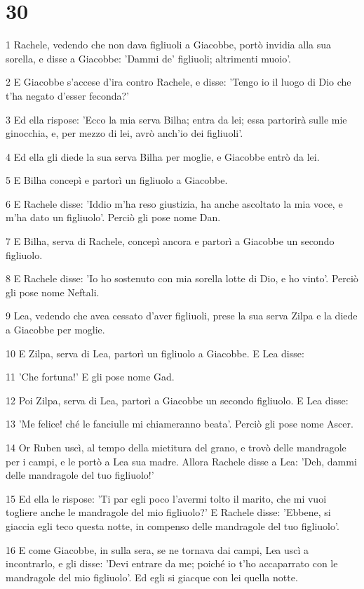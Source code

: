 \chapter{30}

\par 1 Rachele, vedendo che non dava figliuoli a Giacobbe, portò invidia alla sua sorella, e disse a Giacobbe: 'Dammi de' figliuoli; altrimenti muoio'.
\par 2 E Giacobbe s'accese d'ira contro Rachele, e disse: 'Tengo io il luogo di Dio che t'ha negato d'esser feconda?'
\par 3 Ed ella rispose: 'Ecco la mia serva Bilha; entra da lei; essa partorirà sulle mie ginocchia, e, per mezzo di lei, avrò anch'io dei figliuoli'.
\par 4 Ed ella gli diede la sua serva Bilha per moglie, e Giacobbe entrò da lei.
\par 5 E Bilha concepì e partorì un figliuolo a Giacobbe.
\par 6 E Rachele disse: 'Iddio m'ha reso giustizia, ha anche ascoltato la mia voce, e m'ha dato un figliuolo'. Perciò gli pose nome Dan.
\par 7 E Bilha, serva di Rachele, concepì ancora e partorì a Giacobbe un secondo figliuolo.
\par 8 E Rachele disse: 'Io ho sostenuto con mia sorella lotte di Dio, e ho vinto'. Perciò gli pose nome Neftali.
\par 9 Lea, vedendo che avea cessato d'aver figliuoli, prese la sua serva Zilpa e la diede a Giacobbe per moglie.
\par 10 E Zilpa, serva di Lea, partorì un figliuolo a Giacobbe. E Lea disse:
\par 11 'Che fortuna!' E gli pose nome Gad.
\par 12 Poi Zilpa, serva di Lea, partorì a Giacobbe un secondo figliuolo. E Lea disse:
\par 13 'Me felice! ché le fanciulle mi chiameranno beata'. Perciò gli pose nome Ascer.
\par 14 Or Ruben uscì, al tempo della mietitura del grano, e trovò delle mandragole per i campi, e le portò a Lea sua madre. Allora Rachele disse a Lea: 'Deh, dammi delle mandragole del tuo figliuolo!'
\par 15 Ed ella le rispose: 'Ti par egli poco l'avermi tolto il marito, che mi vuoi togliere anche le mandragole del mio figliuolo?' E Rachele disse: 'Ebbene, si giaccia egli teco questa notte, in compenso delle mandragole del tuo figliuolo'.
\par 16 E come Giacobbe, in sulla sera, se ne tornava dai campi, Lea uscì a incontrarlo, e gli disse: 'Devi entrare da me; poiché io t'ho accaparrato con le mandragole del mio figliuolo'. Ed egli si giacque con lei quella notte.
